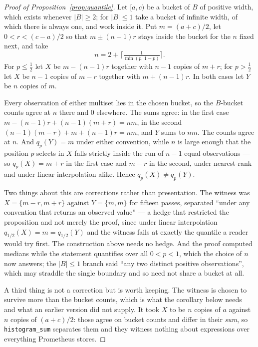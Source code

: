 \begin{proof}[Proof of Proposition~\ref{prop:quantile}]
Let $[a,c)$ be a bucket of $B$ of positive width, which exists whenever $|B|\ge2$; for
$|B|\le1$ take a bucket of infinite width, of which there is always one, and work inside
it. Put $m=(a+c)/2$, let $0<r<(c-a)/2$ so that $m\pm(n-1)r$ stays inside the bucket for
the $n$ fixed next, and take
\[
n = 2+\Big\lceil \tfrac{1}{\min(p,\,1-p)} \Big\rceil .
\]
For $p\le\tfrac12$ let $X$ be $m-(n-1)r$ together with $n-1$ copies of $m+r$; for
$p>\tfrac12$ let $X$ be $n-1$ copies of $m-r$ together with $m+(n-1)r$. In both cases let
$Y$ be $n$ copies of $m$.

Every observation of either multiset lies in the chosen bucket, so the $B$-bucket counts
agree at $n$ there and $0$ elsewhere. The sums agree: in the first case
$m-(n-1)r+(n-1)(m+r)=nm$, in the second $(n-1)(m-r)+m+(n-1)r=nm$, and $Y$ sums to $nm$.
The counts agree at $n$. And $q_p(Y)=m$ under either convention, while $n$ is large
enough that the position $p$ selects in $X$ falls strictly inside the run of $n-1$ equal
observations --- so $q_p(X)=m+r$ in the first case and $m-r$ in the second, under
nearest-rank and under linear interpolation alike. Hence $q_p(X)\neq q_p(Y)$.

Two things about this are corrections rather than presentation. The witness was
$X=\{m-r,m+r\}$ against $Y=\{m,m\}$ for fifteen passes, separated ``under any convention
that returns an observed value'' --- a hedge that restricted the proposition and not
merely the proof, since under linear interpolation $q_{1/2}(X)=m=q_{1/2}(Y)$ and the
witness fails at exactly the quantile a reader would try first. The construction above
needs no hedge. And the proof computed medians while the statement quantifies over all
$0<p<1$, which the choice of $n$ now answers; the $|B|\le1$ branch said ``any two
distinct positive observations'', which may straddle the single boundary and so need not
share a bucket at all.

A third thing is not a correction but is worth keeping. The witness is chosen to survive
more than the bucket counts, which is what the corollary below needs and what an earlier
version did not supply. It took $X$ to be $n$ copies of $a$ against $n$ copies of
$(a+c)/2$: those agree on bucket counts and differ in their \emph{sum}, so
\texttt{histogram\_sum} separates them and they witness nothing about expressions over
everything Prometheus stores.
\end{proof}
